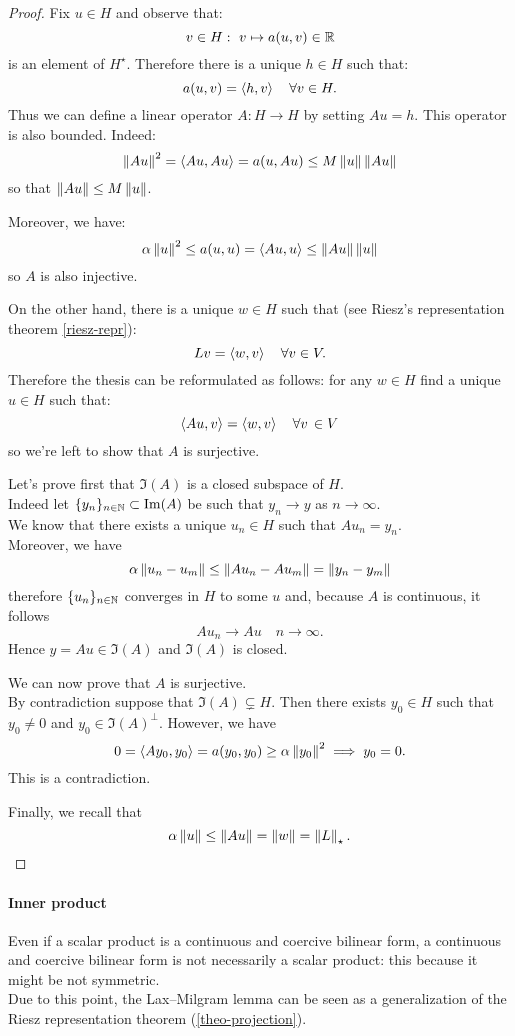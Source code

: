 \begin{proof}
	Fix $u \in H$ and observe that:
	$$
		v \in H:\
		v \mapsto a(u,v) \in \mathbb R
	$$
	is an element of $H^\star$.
	Therefore there is a unique $h \in H$ such that:
	$$
		a(u,v) 
		= \left\langle h,v\right\rangle 
		\quad \forall v \in H
		.
	$$
	Thus we can define a linear operator $A:H \to H$ by setting $Au = h$. This operator is also bounded. Indeed:
	$$
		\left\lVert Au\right\rVert^2 
		= \left\langle Au, Au\right\rangle 
		= a(u, Au) 
		\leq M \left\lVert u\right\rVert \left\lVert Au\right\rVert
	$$
	so that $\left\lVert Au\right\rVert \leq M \left\lVert u\right\rVert$.
	
	Moreover, we have:
	$$
		\alpha\left\lVert u\right\rVert^2 
		\leq a(u,u) 
		= \left\langle Au, u\right\rangle 
		\leq \left\lVert Au\right\rVert\left\lVert u\right\rVert
	$$
	so $A$ is also injective.
	
	On the other hand, there is a unique $w \in H$ such that (see Riesz's representation theorem \vref{riesz-repr}):
	$$
		Lv 
		= \left\langle w, v\right\rangle 
		\quad \forall v \in V
		.
	$$
	Therefore the thesis can be reformulated as follows: for any $w \in H$ find a unique $u \in H$ such that:
	$$
		\left\langle Au, v\right\rangle 
		= \left\langle w,v\right\rangle 
		\quad \forall v \, \in V
	$$
	so we're left to show that $A$ is surjective.
	
	Let's prove first that $\Im(A)$ is a closed subspace of $H$.\\
	Indeed let $\{y_n\}_{n\in \mathbb N} \subset \operatorname{Im}(A)$ be such that $y_n \to y$ as $n \to \infty$.\\
	We know that there exists a unique $u_n \in H$ such that $A u_n = y_n$.\\
	Moreover, we have
	$$
		\alpha \left\lVert u_n - u_m\right\rVert 
		\leq \left\lVert A u_n - A u_m\right\rVert 
		= \left\lVert y_n - y_m\right\rVert
	$$
	therefore $\{u_n\}_{n \in \mathbb N}$ converges in $H$ to some $u$ and, because $A$ is continuous, it follows
	$$
		A u_n 
		\to A u 
		\quad n \to \infty
		.
	$$
	Hence $y=Au \in \Im(A)$ and $\Im(A)$ is closed.
	
	We can now prove that $A$ is surjective.\\
	By contradiction suppose that $\Im(A) \subsetneq H$. Then there exists $y_0 \in H$ such that $y_0 \neq 0$ and $y_0 \in \Im(A)^\perp$. However, we have
	$$
		0 
		= \left\langle A y_0, y_0\right\rangle = a(y_0,y_0) 
		\geq \alpha\left\lVert y_0\right\rVert^2 
		\implies y_0 = 0
		.
	$$
	This is a contradiction.
	
	Finally, we recall that
	$$
		\alpha\left\lVert u\right\rVert 
		\leq \left\lVert Au\right\rVert 
		= \left\lVert w\right\rVert 
		= \left\lVert L\right\rVert_\star
		.
	$$
\end{proof}

\paragraph{Inner product} Even if a scalar product is a continuous and coercive bilinear form, a continuous and coercive bilinear form is not necessarily a scalar product: this because it might be not symmetric.\\
Due to this point, the Lax--Milgram lemma can be seen as a generalization of the Riesz representation theorem (\vref{theo-projection}).

